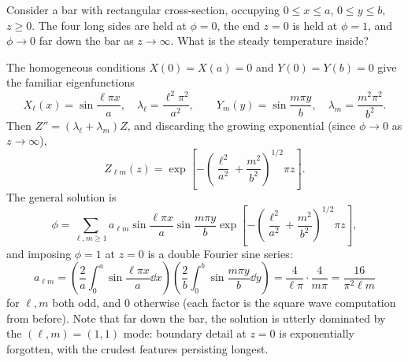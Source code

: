 \begin{example}
    Consider a bar with rectangular cross-section, occupying $0 \leq x \leq a$, $0 \leq y \leq b$, $z \geq 0$. The four long sides are held at $\phi = 0$, the end $z = 0$ is held at $\phi = 1$, and $\phi \rightarrow 0$ far down the bar as $z \rightarrow \infty$. What is the steady temperature inside?

    \begin{center}
    \end{center}

    The homogeneous conditions $X(0) = X(a) = 0$ and $Y(0) = Y(b) = 0$ give the familiar eigenfunctions
    $$
    X_\ell(x) = \sin \frac{\ell \pi x}{a}, \quad \lambda_\ell = \frac{\ell^2 \pi^2}{a^2}, \qquad Y_m(y) = \sin \frac{m \pi y}{b}, \quad \lambda_m = \frac{m^2 \pi^2}{b^2}.
    $$
    Then $Z'' = (\lambda_\ell + \lambda_m) Z$, and discarding the growing exponential (since $\phi \to 0$ as $z \to \infty$),
    $$
    Z_{\ell m}(z) = \exp\left[-\left(\frac{\ell^2}{a^2} + \frac{m^2}{b^2}\right)^{1/2} \pi z\right].
    $$
    The general solution is
    $$
    \phi = \sum_{\ell, m \geq 1} a_{\ell m} \sin \frac{\ell \pi x}{a} \sin \frac{m \pi y}{b} \exp\left[-\left(\frac{\ell^2}{a^2} + \frac{m^2}{b^2}\right)^{1/2} \pi z \right],
    $$
    and imposing $\phi = 1$ at $z = 0$ is a double Fourier sine series:
    $$
    a_{\ell m} = \left(\frac{2}{a}\int_0^a \sin \frac{\ell \pi x}{a} \dd x \right)\left(\frac{2}{b} \int_0^b \sin \frac{m \pi y}{b} \dd y\right) = \frac{4}{\ell \pi}\cdot \frac{4}{m \pi} = \frac{16}{\pi^2 \ell m}
    $$
    for $\ell, m$ both odd, and $0$ otherwise (each factor is the square wave computation from before).
    Note that far down the bar, the solution is utterly dominated by the $(\ell, m) = (1,1)$ mode: boundary detail at $z = 0$ is exponentially forgotten, with the crudest features persisting longest.
\end{example}

